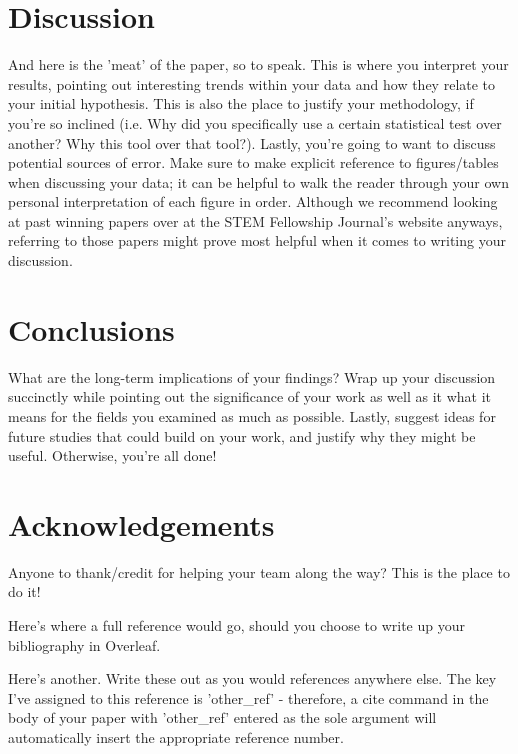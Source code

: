 \documentclass[10pt,twocolumn,letterpaper]{article}
\begin{document}
\section{Discussion}
And here is the 'meat' of the paper, so to speak. This is where you interpret your results, pointing out interesting trends within your data and how they relate to your initial hypothesis. This is also the place to justify your methodology, if you're so inclined (i.e. Why did you specifically use a certain statistical test over another? Why this tool over that tool?). Lastly, you're going to want to discuss potential sources of error. Make sure to make explicit reference to figures/tables when discussing your data; it can be helpful to walk the reader through your own personal interpretation of each figure in order. Although we recommend looking at past winning papers over at the STEM Fellowship Journal's website anyways, referring to those papers might prove most helpful when it comes to writing your discussion.

\section*{Conclusions}
What are the long-term implications of your findings? Wrap up your discussion succinctly while pointing out the significance of your work as well as it what it means for the fields you examined as much as possible. Lastly, suggest ideas for future studies that could build on your work, and justify why they might be useful. Otherwise, you're all done!

\section*{Acknowledgements}
Anyone to thank/credit for helping your team along the way? This is the place to do it!

\begin{thebibliography}{9}
 Here's where a full reference would go, should you choose to write up your bibliography in Overleaf.

 Here's another. Write these out as you would references anywhere else. The key I've assigned to this reference is 'other\_ref' - therefore, a cite command in the body of your paper with 'other\_ref' entered as the sole argument will automatically insert the appropriate reference number.
\end{thebibliography}
\end{document}
